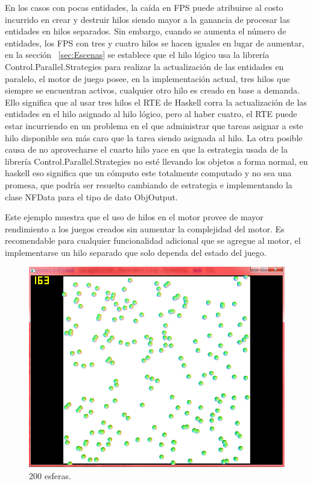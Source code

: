 En los casos con pocas entidades, la caída en FPS puede atribuirse al costo incurrido en crear y destruir hilos siendo mayor a la ganancia de procesar las entidades en hilos separados. Sin embargo, cuando se aumenta el número de entidades, los FPS con tres y cuatro hilos se hacen iguales en lugar de aumentar, en la sección ~\ref{sec:Escenas} se establece que el hilo lógico usa la librería Control.Parallel.Strategies para realizar la actualización de las entidades en paralelo, el motor de juego posee, en la implementación actual, tres hilos que siempre se encuentran activos, cualquier otro hilo es creado en base a demanda. Ello significa que al usar tres hilos el RTE de Haskell corra la actualización de las entidades en el hilo asignado al hilo lógico, pero al haber cuatro, el RTE puede estar incurriendo en un problema en el que administrar que tareas asignar a este hilo disponible sea más caro que la tarea siendo asignada al hilo. La otra posible causa de no aprovecharse el cuarto hilo yace en que la estrategia usada de la librería Control.Parallel.Strategies no esté llevando los objetos a forma normal, en haskell eso significa que un cómputo este totalmente computado y no sea una promesa, que podría ser resuelto cambiando de estrategia e implementando la clase NFData para el tipo de dato ObjOutput.

Este ejemplo muestra que el uso de hilos en el motor provee de mayor rendimiento a los juegos creados sin aumentar la complejidad del motor. Es recomendable para cualquier funcionalidad adicional que se agregue al motor, el implementarse un hilo separado que solo dependa del estado del juego.

\begin{figure}[htbp!]
\centering
\includegraphics[width=1.0\textwidth]{sceenshot2}
\caption[Ejemplo 2]{200 esferas.}
\end{figure}

